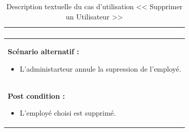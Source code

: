 \documentclass[12pt]{report}
\begin{document}
\begin{table}[H]
\begin{tabular}{|p{2.5cm}|p{14.5cm}|}
{\begin{enumerate}
   \end{enumerate}} \\
   \hline
   \multicolumn{2}{|p{17cm}|}{\textbf{ Scénario alternatif : }
   \begin{itemize}[label={$\bullet$}]
      \item  L'administarteur annule la supression de l'employé.   
   \end{itemize}} \\
   \hline
   \multicolumn{2}{|p{17cm}|}{\textbf{ Post condition : }
   \begin{itemize}[label={$\bullet$}]
      \item  L'employé choisi est supprimé.
   \end{itemize}} \\
   \hline
\end{tabular}
\caption{Description textuelle du cas d'utilisation << Supprimer un Utilisateur >>}
\end{table}
\end{document}
